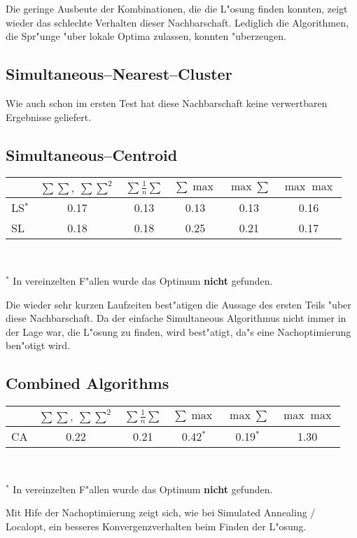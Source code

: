 Die geringe Ausbeute der Kombinationen, die die L"osung finden konnten,
zeigt wieder das schlechte Verhalten dieser Nachbarschaft. Lediglich
die Algorithmen, die Spr"unge "uber lokale Optima zulassen, 
konnten "uberzeugen.

\subsection*{Simultaneous--Nearest--Cluster}
Wie auch schon im ersten Test hat diese Nachbarschaft keine verwertbaren
Ergebnisse geliefert.

\subsection*{Simultaneous--Centroid}
\begin{center}
\begin{tabular}{l|c|c|c|c|c}
 & $\sum\sum,\ \sum\sum^2$ & $\sum \frac 1n \sum$ & $\sum\max$ & $ \max\sum$ &
 	$\max\max$\\
	\hline
LS$^*$ & 0.17 & 0.13 & 0.13 & 0.13 & 0.16 \\
SL     & 0.18 & 0.18 & 0.25 & 0.21 & 0.17 
\end{tabular}\\
\end{center}
$^*$ In vereinzelten F"allen wurde das Optimum {\bf nicht} gefunden.

Die wieder sehr kurzen Laufzeiten best"atigen die Aussage des ersten Teils
"uber diese Nachbarschaft. Da der einfache Simultaneous Algorithmus
nicht immer in der Lage war, die L"osung zu finden, wird best"atigt,
da"s eine Nachoptimierung ben"otigt wird.

\subsection*{Combined Algorithms}
\begin{center}
\begin{tabular}{l|c|c|c|c|c}
 & $\sum\sum,\ \sum\sum^2$ & $\sum \frac 1n \sum$ & $\sum\max$ & $ \max\sum$ &
 	$\max\max$\\
	\hline
CA & 0.22 & 0.21 & 0.42$^*$ & 0.19$^*$ & 1.30
\end{tabular}\\
\end{center}
$^*$ In vereinzelten F"allen wurde das Optimum {\bf nicht} gefunden.

Mit Hife der Nachoptimierung zeigt sich, wie bei Simulated Annealing /
Localopt, ein besseres Konvergenzverhalten beim Finden der L"osung.

